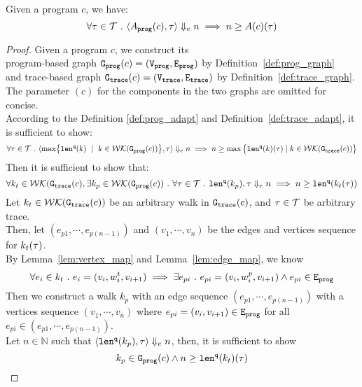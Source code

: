   \begin{thm}
    \label{thm:adaptfun_soundness}
  Given a program ${c}$, we have:
  \[
    \forall \mathtt{\tau} \in \mathcal{T} ~.~  
    \langle A_{\mathtt{prog}}(c), \mathtt{\tau} \rangle \Downarrow_e n \implies n \geq A(c)(\mathtt{\tau})
  \]
  \end{thm}
\begin{proof}
Given a program ${c}$, 
we construct its 
\\
program-based graph $\mathtt{{G_{prog}}}({c}) = (\mathtt{{V_{prog}}}, \mathtt{{E_{prog}}})$
by Definition~\ref{def:prog_graph}
\\ and 
trace-based graph $\mathtt{{G_{trace}}}({c}) = (\mathtt{{V_{trace}}}, \mathtt{{E_{trace}}})$  by Definition~\ref{def:trace_graph}.
\\
The parameter $(c)$ for the components in the two graphs are omitted for concise.
\\
%
According to the Definition \ref{def:prog_adapt} and Definition~\ref{def:trace_adapt}, it is sufficient to show:
%
$$
\forall \trace \in \mathcal{T} \sthat 
\config{\max\left\{ \qlen(k) \ \mid \  k\in \walks(\progG({c}))\right \}
, \trace } \earrow n \implies
n \geq
\max \big 
\{ \qlen(k)(\trace) \mid k \in \walks(\traceG(c)) \big \} 
$$
%
%
Then it is sufficient to show that:
\[
  \forall 
  k_t \in \mathcal{WK}(\mathtt{{G_{trace}}}({c}),
  \exists k_p \in \mathcal{WK}(\mathtt{{G_{prog}}}({c})) 
  ~.~  \forall \mathtt{\tau} \in \mathcal{T} ~.~ 
  \mathtt{len}^{\tt q}(k_p), \mathtt{\tau} \Downarrow_e n
   \implies 
  n \geq \mathtt{len}^{\tt q}(k_t(\mathtt{\tau}))
\]
%
Let $k_t\in \mathcal{WK}(\mathtt{{G_{trace}}}(c))$ be an arbitrary walk in $\mathtt{{G_{trace}}}(c)$, 
and $\mathtt{\tau} \in \mathcal{T}$ be arbitrary trace.
\\
Then, 
let $(e_{p1}, \cdots, e_{p(n-1)}) $ and
$(v_1, \cdots, v_n)$ be the edges and vertices sequence  for $k_t(\mathtt{\tau})$.
\\
%
By Lemma~\ref{lem:vertex_map} and Lemma~\ref{lem:edge_map}, we know
%
\[
  \forall e_i \in k_t ~.~  e_i = (v_i, w^t_{i}, v_{i + 1}) \implies
  \exists e_{pi} ~.~  e_{pi} = (v_i, w^p_i, v_{i + 1}) \land e_{pi} \in \mathtt{{E_{prog}}}
  \]
Then we construct a walk $k_p$ with an edge sequence $(e_{p1}, \cdots, e_{p(n-1)}) $ 
with a vertices sequence $(v_1, \cdots, v_n)$ where 
$e_{pi} = (v_i, v_{i + 1}) \in \mathtt{{E_{prog}}}$ for all $e_{pi} \in (e_{p1}, \cdots, e_{p(n-1)})$.
\\
Let $n \in \mathbb{N}$ such that 
$\langle \mathtt{len}^{\tt q}(k_p), \mathtt{\tau} \rangle \Downarrow_e n$,
then, it is sufficient to show
\[
  k_p \in \mathtt{{G_{prog}}}(c) \land n \geq \mathtt{len}^{\tt q}(k_t)(\mathtt{\tau})
  \] 

\end{proof}
